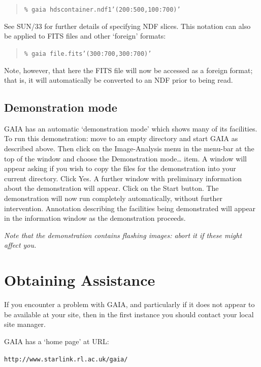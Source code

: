 \documentclass[twoside,11pt]{article}
\newcommand{\htmladdnormallink}[2]{#1}
\newcommand{\xref}[3]{#1}
\newcommand{\xlabel}[1]{}
\renewcommand{\_}{\texttt{\symbol{95}}}
\begin{document}
\begin{quote}
{\tt \% gaia hdscontainer.ndf\_1'(200:500,100:700)'}
\end{quote}

See \xref{SUN/33}{sun33}{}\cite{SUN33} for further details of specifying
NDF slices.  This notation can also be applied to FITS files and other
`foreign' formats:

\begin{quote}
{\tt \% gaia file.fits'(300:700,300:700)'}
\end{quote}

Note, however, that here the FITS file will now be accessed as a foreign
format; that is, it will automatically be converted to an NDF prior to
being read.

\subsection{Demonstration mode}

GAIA has an automatic `demonstration mode' which shows many of its
facilities.  To run this demonstration: move to an empty directory and
start GAIA as described above.  Then click on the {\sf Image-Analysis} menu
in the menu-bar at the top of the window and choose the {\sf Demonstration
mode\ldots} item.  A window will appear asking if you wish to copy the
files for the demonstration into your current directory.  Click {\sf
Yes}.  A further window with preliminary information about the demonstration
will appear.  Click on the {\sf Start} button.  The demonstration will now
run completely automatically, without further intervention.  Annotation
describing the facilities being demonstrated will appear in the
information window as the demonstration proceeds.

{\it Note that the demonstration contains flashing images: abort it if
these might affect you.}


\section{\xlabel{ASSIST}\label{ASSIST}Obtaining  Assistance}

If you encounter a problem with GAIA, and particularly if it does not appear
to be available at your site, then in the first instance you should contact
your local site manager.

GAIA has a `home page' at URL:

\begin{center}
\htmladdnormallink{{\tt http://www.starlink.rl.ac.uk/gaia/}}
{http://www.starlink.rl.ac.uk/gaia/}
\end{center}
\end{document}
